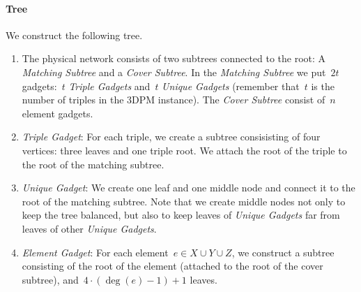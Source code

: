 \documentclass[preprint,12pt]{elsarticle}
\newcommand{\TDPM}{\textsc{3DPM}}
\newcommand{\MatchSubtree}{{\emph{Matching Subtree}}}
\newcommand{\CoverSubtree}{{\emph{Cover Subtree}}}
\newcommand{\TripleGadget}{{\emph{Triple Gadget}}}
\newcommand{\TripleGadgets}{{\emph{Triple Gadgets}}}
\newcommand{\UnqGadget}{{\emph{Unique Gadget}}}
\newcommand{\UnqGadgets}{{\emph{Unique Gadgets}}}
\newcommand{\ElGadget}{{\emph{Element Gadget}}}
\begin{document}
\paragraph{Tree}
We construct the following tree.
\begin{enumerate}
  \item The physical network consists of two subtrees connected to the
  root: A {\MatchSubtree} and a {\CoverSubtree}. In the
  {\MatchSubtree} we put~$2t$ gadgets:~$t$ {\TripleGadgets} and~$t$
  {\UnqGadgets} (remember that~$t$ is the number of triples in the {\TDPM}
  instance). The {\CoverSubtree} consist of~$n$ element gadgets.
  \item \TripleGadget: For each triple, we create a subtree
  consisisting of four vertices: three leaves and one triple root.  We
  attach the root of the triple to the root of the matching subtree.
  \item \UnqGadget: We create one leaf and one middle node and connect
  it to the root of the matching subtree.  Note that we create middle
  nodes not only to keep the tree balanced, but also to keep leaves of
  {\UnqGadgets} far from leaves of other \UnqGadgets.
  \item \ElGadget: For each element~$e \in X\cup Y\cup Z$, we
  construct a subtree consisting of the root of the element (attached
  to the root of the cover subtree), and~$4\cdot(\deg(e)-1)+1$ leaves.
\end{enumerate}
\end{document}
